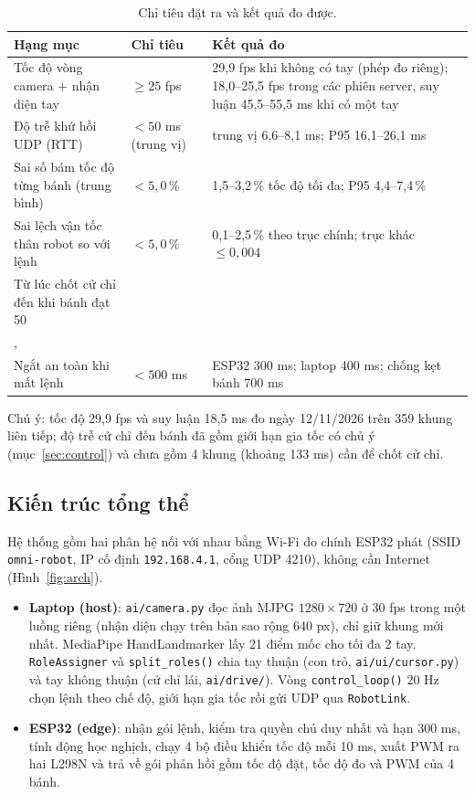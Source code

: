 \documentclass[11pt,a4paper]{article}
\newcommand{\code}[1]{\texttt{\small #1}}
\begin{document}
\begin{table}[H]
\caption{Chỉ tiêu đặt ra và kết quả đo được.}
\label{tab:spec}
\centering\small
\begin{tabular}{p{4.6cm}p{2.3cm}p{5.2cm}}
\toprule
Hạng mục & Chỉ tiêu & Kết quả đo \\
\midrule
Tốc độ vòng camera + nhận diện tay & $\ge 25$ fps & 29,9 fps khi không có tay (phép đo riêng); 18,0--25,5 fps trong các phiên server, suy luận 45,5--55,5 ms khi có một tay \\
Độ trễ khứ hồi UDP (RTT) & $<50$ ms (trung vị) & trung vị 6,6--8,1 ms; P95 16,1--26,1 ms \\
Sai số bám tốc độ từng bánh (trung bình) & $<5{,}0\,\%$ & 1,5--3,2\,\% tốc độ tối đa; P95 4,4--7,4\,\% \\
Sai lệch vận tốc thân robot so với lệnh & $<5{,}0\,\%$ & 0,1--2,5\,\% theo trục chính; trục khác $\le 0{,}004$ \\
Từ lúc chốt cử chỉ đến khi bánh đạt 50\\,\\%
Ngắt an toàn khi mất lệnh & $<500$ ms & ESP32 300 ms; laptop 400 ms; chống kẹt bánh 700 ms \\
\bottomrule
\end{tabular}
\end{table}
Chú ý: tốc độ 29,9 fps và suy luận 18,5 ms đo ngày 12/11/2026 trên 359 khung liên tiếp; độ trễ cử chỉ đến bánh đã gồm giới hạn gia tốc có chủ ý (mục~\ref{sec:control}) và chưa gồm 4 khung (khoảng 133 ms) cần để chốt cử chỉ.

\subsection{Kiến trúc tổng thể}
Hệ thống gồm hai phân hệ nối với nhau bằng Wi-Fi do chính ESP32 phát (SSID \code{omni-robot}, IP cố định \code{192.168.4.1}, cổng UDP 4210), không cần Internet (Hình~\ref{fig:arch}).

\begin{itemize}
  \item \textbf{Laptop (host)}: \code{ai/camera.py} đọc ảnh MJPG $1280\times720$ ở 30 fps trong một luồng riêng (nhận diện chạy trên bản sao rộng 640 px), chỉ giữ khung mới nhất. MediaPipe HandLandmarker lấy 21 điểm mốc cho tối đa 2 tay. \code{RoleAssigner} và \code{split\_roles()} chia tay thuận (con trỏ, \code{ai/ui/cursor.py}) và tay không thuận (cử chỉ lái, \code{ai/drive/}). Vòng \code{control\_loop()} 20 Hz chọn lệnh theo chế độ, giới hạn gia tốc rồi gửi UDP qua \code{RobotLink}.
  \item \textbf{ESP32 (edge)}: nhận gói lệnh, kiểm tra quyền chủ duy nhất và hạn 300 ms, tính động học nghịch, chạy 4 bộ điều khiển tốc độ mỗi 10 ms, xuất PWM ra hai L298N và trả về gói phản hồi gồm tốc độ đặt, tốc độ đo và PWM của 4 bánh.
\end{itemize}
\end{document}
